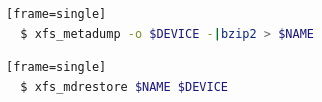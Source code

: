 \documentclass[
  color, %
  table, %
  lof,   %
  lot,   %
]{fithesis3}
\begin{document}
\begin{lstlisting}[language=bash, caption={Creating compressed image using \textit{xfs\_metadump}}][frame=single]
  $ xfs_metadump -o $DEVICE -|bzip2 > $NAME
\end{lstlisting}

\begin{lstlisting}[language=bash, caption={Reloading image using \textit{xfs\_mdrestore}}][frame=single]
  $ xfs_mdrestore $NAME $DEVICE
\end{lstlisting}





\end{document}

